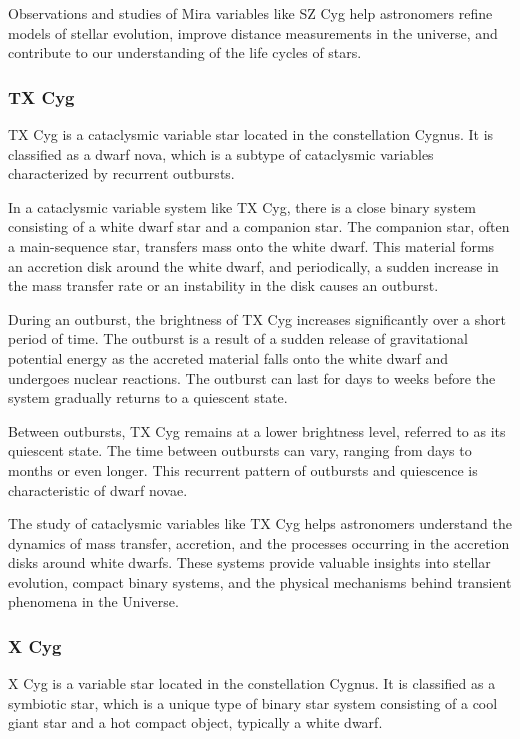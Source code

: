 Observations and studies of Mira variables like SZ Cyg help astronomers refine models of stellar evolution, improve distance measurements in the universe, and contribute to our understanding of the life cycles of stars.

\subsubsection*{ TX Cyg }
TX Cyg is a cataclysmic variable star located in the constellation Cygnus. It is classified as a dwarf nova, which is a subtype of cataclysmic variables characterized by recurrent outbursts.

In a cataclysmic variable system like TX Cyg, there is a close binary system consisting of a white dwarf star and a companion star. The companion star, often a main-sequence star, transfers mass onto the white dwarf. This material forms an accretion disk around the white dwarf, and periodically, a sudden increase in the mass transfer rate or an instability in the disk causes an outburst.

During an outburst, the brightness of TX Cyg increases significantly over a short period of time. The outburst is a result of a sudden release of gravitational potential energy as the accreted material falls onto the white dwarf and undergoes nuclear reactions. The outburst can last for days to weeks before the system gradually returns to a quiescent state.

Between outbursts, TX Cyg remains at a lower brightness level, referred to as its quiescent state. The time between outbursts can vary, ranging from days to months or even longer. This recurrent pattern of outbursts and quiescence is characteristic of dwarf novae.

The study of cataclysmic variables like TX Cyg helps astronomers understand the dynamics of mass transfer, accretion, and the processes occurring in the accretion disks around white dwarfs. These systems provide valuable insights into stellar evolution, compact binary systems, and the physical mechanisms behind transient phenomena in the Universe.



\subsubsection*{ X Cyg }
X Cyg is a variable star located in the constellation Cygnus. It is classified as a symbiotic star, which is a unique type of binary star system consisting of a cool giant star and a hot compact object, typically a white dwarf.

